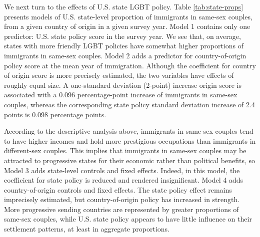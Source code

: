 \documentclass[
  11pt,
]{article}
\begin{document}
We next turn to the effects of U.S. state LGBT policy. Table \ref{tab:state-props} presents models of U.S. state-level proportion of immigrants in same-sex couples, from a given country of origin in a given survey year. Model 1 contains only one predictor: U.S. state policy score in the survey year. We see that, on average, states with more friendly LGBT policies have somewhat higher proportions of immigrants in same-sex couples. Model 2 adds a predictor for country-of-origin policy score at the mean year of immigration. Although the coefficient for country of origin score is more precisely estimated, the two variables have effects of roughly equal size. A one-standard deviation (2-point) increase origin score is associated with a 0.096 percentage-point increase of immigrants in same-sex couples, whereas the corresponding state policy standard deviation increase of 2.4 points is 0.098 percentage points.

According to the descriptive analysis above, immigrants in same-sex couples tend to have higher incomes and hold more prestigious occupations than immigrants in different-sex couples. This implies that immigrants in same-sex couples may be attracted to progressive states for their economic rather than political benefits, so Model 3 adds state-level controls and fixed effects. Indeed, in this model, the coefficient for state policy is reduced and rendered insignificant. Model 4 adds country-of-origin controls and fixed effects. The state policy effect remains imprecisely estimated, but country-of-origin policy has increased in strength. More progressive sending countries are represented by greater proportions of same-sex couples, while U.S. state policy appears to have little influence on their settlement patterns, at least in aggregate proportions.
\end{document}
